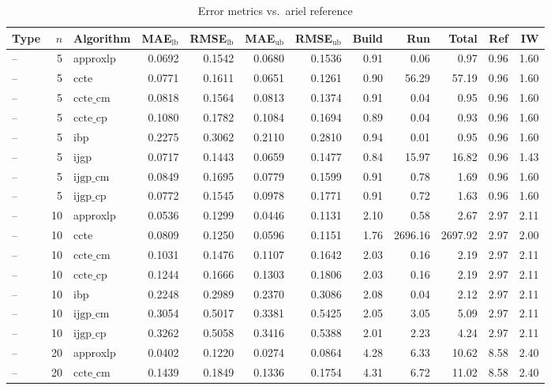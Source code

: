 \begin{table}[ht]
\centering
\scriptsize
\caption{Error metrics vs.\ ariel reference}
\begin{tabular}{lrlrrrrrrrrr}
\toprule
Type & $n$ & Algorithm & MAE$_{\text{lb}}$ & RMSE$_{\text{lb}}$ & MAE$_{\text{ub}}$ & RMSE$_{\text{ub}}$ & Build & Run & Total & Ref & IW \\
\midrule
-- & 5 & approxlp & 0.0692 & 0.1542 & 0.0680 & 0.1536 & 0.91 & 0.06 & 0.97 & 0.96 & 1.60 \\
-- & 5 & ccte & 0.0771 & 0.1611 & 0.0651 & 0.1261 & 0.90 & 56.29 & 57.19 & 0.96 & 1.60 \\
-- & 5 & $\text{ccte\_cm}$ & 0.0818 & 0.1564 & 0.0813 & 0.1374 & 0.91 & 0.04 & 0.95 & 0.96 & 1.60 \\
-- & 5 & $\text{ccte\_cp}$ & 0.1080 & 0.1782 & 0.1084 & 0.1694 & 0.89 & 0.04 & 0.93 & 0.96 & 1.60 \\
-- & 5 & ibp & 0.2275 & 0.3062 & 0.2110 & 0.2810 & 0.94 & 0.01 & 0.95 & 0.96 & 1.60 \\
-- & 5 & ijgp & 0.0717 & 0.1443 & 0.0659 & 0.1477 & 0.84 & 15.97 & 16.82 & 0.96 & 1.43 \\
-- & 5 & $\text{ijgp\_cm}$ & 0.0849 & 0.1695 & 0.0779 & 0.1599 & 0.91 & 0.78 & 1.69 & 0.96 & 1.60 \\
-- & 5 & $\text{ijgp\_cp}$ & 0.0772 & 0.1545 & 0.0978 & 0.1771 & 0.91 & 0.72 & 1.63 & 0.96 & 1.60 \\
-- & 10 & approxlp & 0.0536 & 0.1299 & 0.0446 & 0.1131 & 2.10 & 0.58 & 2.67 & 2.97 & 2.11 \\
-- & 10 & ccte & 0.0809 & 0.1250 & 0.0596 & 0.1151 & 1.76 & 2696.16 & 2697.92 & 2.97 & 2.00 \\
-- & 10 & $\text{ccte\_cm}$ & 0.1031 & 0.1476 & 0.1107 & 0.1642 & 2.03 & 0.16 & 2.19 & 2.97 & 2.11 \\
-- & 10 & $\text{ccte\_cp}$ & 0.1244 & 0.1666 & 0.1303 & 0.1806 & 2.03 & 0.16 & 2.19 & 2.97 & 2.11 \\
-- & 10 & ibp & 0.2248 & 0.2989 & 0.2370 & 0.3086 & 2.08 & 0.04 & 2.12 & 2.97 & 2.11 \\
-- & 10 & $\text{ijgp\_cm}$ & 0.3054 & 0.5017 & 0.3381 & 0.5425 & 2.05 & 3.05 & 5.09 & 2.97 & 2.11 \\
-- & 10 & $\text{ijgp\_cp}$ & 0.3262 & 0.5058 & 0.3416 & 0.5388 & 2.01 & 2.23 & 4.24 & 2.97 & 2.11 \\
-- & 20 & approxlp & 0.0402 & 0.1220 & 0.0274 & 0.0864 & 4.28 & 6.33 & 10.62 & 8.58 & 2.40 \\
-- & 20 & $\text{ccte\_cm}$ & 0.1439 & 0.1849 & 0.1336 & 0.1754 & 4.31 & 6.72 & 11.02 & 8.58 & 2.40 \\

\end{tabular}
\end{table}

